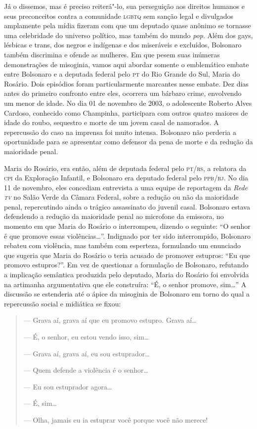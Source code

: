 Já o dissemos, mas é preciso reiterá"-lo, sua perseguição aos direitos
humanos e seus preconceitos contra a comunidade \textsc{lgbtq} sem sanção legal e
divulgados amplamente pela mídia fizeram com que um deputado quase
anônimo se tornasse uma celebridade do universo político, mas também do
mundo \emph{pop}. Além dos gays, lésbicas e trans, dos negros e
indígenas e dos miseráveis e excluídos, Bolsonaro também discrimina e
ofende as mulheres. Em que pesem suas inúmeras demonstrações de
misoginia, vamos aqui abordar somente o emblemático embate entre
Bolsonaro e a deputada federal pelo \textsc{pt} do Rio Grande do Sul, Maria do
Rosário. Dois episódios foram particularmente marcantes nesse embate.
Dez dias antes do primeiro confronto entre eles, ocorrera um bárbaro
crime, envolvendo um menor de idade. No dia 01 de novembro de 2003, o
adolescente Roberto Alves Cardoso, conhecido como Champinha, participara
com outros quatro maiores de idade do roubo, sequestro e morte de um
jovem casal de namorados. A repercussão do caso na imprensa foi muito
intensa. Bolsonaro não perderia a oportunidade para se apresentar como
defensor da pena de morte e da redução da maioridade penal.

Maria do Rosário, era então, além de deputada federal pelo \textsc{pt}/\textsc{rs}, a
relatora da \textsc{cpi} da Exploração Infantil, e Bolsonaro era deputado federal
pelo \textsc{ppb}/\textsc{rj}. No dia 11 de novembro, eles concediam entrevista a uma
equipe de reportagem da \emph{Rede \textsc{tv}} no Salão Verde da Câmara Federal,
sobre a redução ou não da maioridade penal, repercutindo ainda o trágico
assassinato do juvenil casal. Bolsonaro estava defendendo a redução da
maioridade penal ao microfone da emissora, no momento em que Maria do
Rosário o interrompeu, dizendo o seguinte: ``O senhor é que promove
essas violências\ldots{}''. Indignado por ter sido interrompido, Bolsonaro
rebateu com violência, mas também com esperteza, formulando um enunciado
que sugeria que Maria do Rosário o teria acusado de promover estupros:
``Eu que promovo estupros?''. Em vez de questionar a formulação de
Bolsonaro, refutando a implicação semântica produzida pelo deputado,
Maria do Rosário foi envolvida na artimanha argumentativa que ele
construíra: ``É, o senhor promove, sim\ldots{}'' A discussão se estenderia
até o ápice da misoginia de Bolsonaro em torno do qual a repercussão
social e midiática se fixou:

\begin{quote}
\forceindent{}--- Grava aí, grava aí que eu promovo estupro. Grava aí\ldots{}

--- É, o senhor, eu estou vendo isso, sim\ldots{}

--- Grava aí, grava aí, eu sou estuprador\ldots{}

--- Quem defende a violência é o senhor\ldots{}

--- Eu sou estuprador agora\ldots{}

--- É, sim\ldots{}

--- Olha, jamais eu ia estuprar você porque você não merece!
\end{quote}

